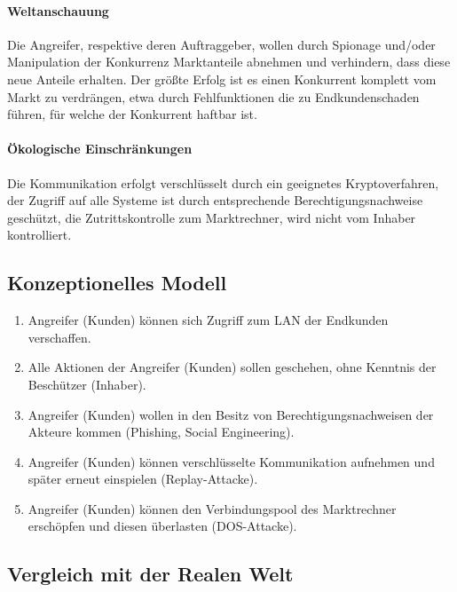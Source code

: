 \documentclass[11pt,a4paper]{report}
\begin{document}
\paragraph{Weltanschauung} Die Angreifer, respektive deren Auftraggeber, wollen durch Spionage und/oder Manipulation der Konkurrenz Marktanteile abnehmen und verhindern, dass diese neue Anteile erhalten. Der größte Erfolg ist es einen Konkurrent komplett vom Markt zu verdrängen, etwa durch Fehlfunktionen die zu Endkundenschaden führen, für welche der Konkurrent haftbar ist. 

\paragraph{Ökologische Einschränkungen} Die Kommunikation erfolgt verschlüsselt durch ein geeignetes Kryptoverfahren, der Zugriff auf alle Systeme ist durch entsprechende Berechtigungsnachweise geschützt, die Zutrittskontrolle zum Marktrechner, wird nicht vom Inhaber kontrolliert.

\subsection{Konzeptionelles Modell}

\begin{enumerate}[leftmargin=*]
\item Angreifer (Kunden) können sich Zugriff zum LAN der Endkunden verschaffen.
\item Alle Aktionen der Angreifer (Kunden) sollen geschehen, ohne Kenntnis der Beschützer (Inhaber).
\item Angreifer (Kunden) wollen in den Besitz von Berechtigungsnachweisen der Akteure kommen (Phishing, Social Engineering).
\item Angreifer (Kunden) können verschlüsselte Kommunikation aufnehmen und später erneut einspielen (Replay-Attacke).
\item Angreifer (Kunden) können den Verbindungspool des Marktrechner erschöpfen und diesen überlasten (DOS-Attacke).
\end{enumerate}

\subsection{Vergleich mit der Realen Welt}
\end{document}
